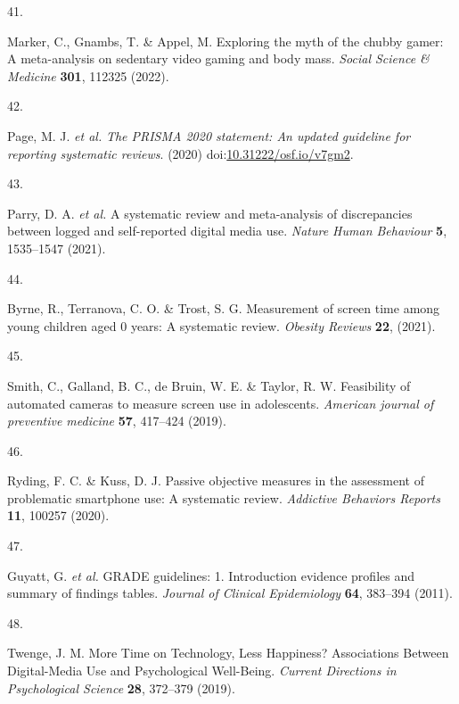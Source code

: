 \documentclass[
  english,
  man]{apa6}
\newlength{\cslhangindent}
\newlength{\csllabelwidth}
\newenvironment{CSLReferences}[2] %
 {%
  \setlength{\parindent}{0pt}
  \ifodd #1 \everypar{\setlength{\hangindent}{\cslhangindent}}\ignorespaces\fi
  \ifnum #2 > 0
  \setlength{\parskip}{#2\baselineskip}
  \fi
 }%
 {}
\newcommand{\CSLLeftMargin}[1]{\parbox[t]{\csllabelwidth}{#1}}
\newcommand{\CSLRightInline}[1]{\parbox[t]{\linewidth - \csllabelwidth}{#1}\break}
\begin{document}
\begin{CSLReferences}{0}{0}
\leavevmode{}%
\CSLLeftMargin{41. }
\CSLRightInline{Marker, C., Gnambs, T. \& Appel, M. Exploring the myth of the chubby gamer: {A} meta-analysis on sedentary video gaming and body mass. \emph{Social Science \& Medicine} \textbf{301}, 112325 (2022).}

\leavevmode{}%
\CSLLeftMargin{42. }
\CSLRightInline{Page, M. J. \emph{et al.} \emph{The {PRISMA} 2020 statement: An updated guideline for reporting systematic reviews}. (2020) doi:\href{https://doi.org/10.31222/osf.io/v7gm2}{10.31222/osf.io/v7gm2}.}

\leavevmode{}%
\CSLLeftMargin{43. }
\CSLRightInline{Parry, D. A. \emph{et al.} A systematic review and meta-analysis of discrepancies between logged and self-reported digital media use. \emph{Nature Human Behaviour} \textbf{5}, 1535--1547 (2021).}

\leavevmode{}%
\CSLLeftMargin{44. }
\CSLRightInline{Byrne, R., Terranova, C. O. \& Trost, S. G. Measurement of screen time among young children aged 0\textendash 6 years: {A} systematic review. \emph{Obesity Reviews} \textbf{22}, (2021).}

\leavevmode{}%
\CSLLeftMargin{45. }
\CSLRightInline{Smith, C., Galland, B. C., de Bruin, W. E. \& Taylor, R. W. Feasibility of automated cameras to measure screen use in adolescents. \emph{American journal of preventive medicine} \textbf{57}, 417--424 (2019).}

\leavevmode{}%
\CSLLeftMargin{46. }
\CSLRightInline{Ryding, F. C. \& Kuss, D. J. Passive objective measures in the assessment of problematic smartphone use: {A} systematic review. \emph{Addictive Behaviors Reports} \textbf{11}, 100257 (2020).}

\leavevmode{}%
\CSLLeftMargin{47. }
\CSLRightInline{Guyatt, G. \emph{et al.} {GRADE} guidelines: 1. {Introduction}\textemdash{{GRADE}} evidence profiles and summary of findings tables. \emph{Journal of Clinical Epidemiology} \textbf{64}, 383--394 (2011).}

\leavevmode{}%
\CSLLeftMargin{48. }
\CSLRightInline{Twenge, J. M. More {Time} on {Technology}, {Less Happiness}? {Associations Between Digital-Media Use} and {Psychological Well-Being}. \emph{Current Directions in Psychological Science} \textbf{28}, 372--379 (2019).}


\end{CSLReferences}
\end{document}
